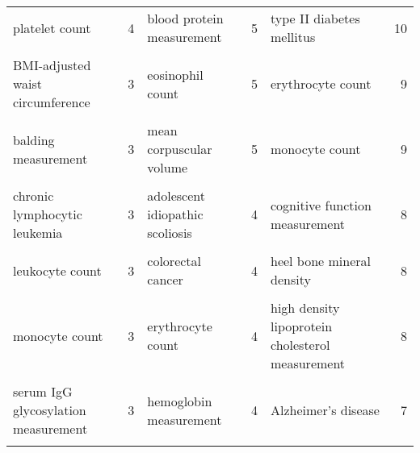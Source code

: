 \begin{landscape}
\begin{table}[hp]
{\begin{tabular}[t]{lrlrlr}
platelet count & 4 & blood protein measurement & 5 & type II diabetes mellitus & 10\\
\cellcolor{gray!6}{Abnormality of refraction} & \cellcolor{gray!6}{3} & \cellcolor{gray!6}{diastolic blood pressure} & \cellcolor{gray!6}{5} & \cellcolor{gray!6}{colorectal cancer} & \cellcolor{gray!6}{9}\\
BMI-adjusted waist circumference & 3 & eosinophil count & 5 & erythrocyte count & 9\\
\cellcolor{gray!6}{DNA methylation} & \cellcolor{gray!6}{3} & \cellcolor{gray!6}{lymphocyte percentage of leukocytes} & \cellcolor{gray!6}{5} & \cellcolor{gray!6}{intelligence} & \cellcolor{gray!6}{9}\\
balding measurement & 3 & mean corpuscular volume & 5 & monocyte count & 9\\
\cellcolor{gray!6}{bone density} & \cellcolor{gray!6}{3} & \cellcolor{gray!6}{schizophrenia} & \cellcolor{gray!6}{5} & \cellcolor{gray!6}{smoking status measurement} & \cellcolor{gray!6}{9}\\
chronic lymphocytic leukemia & 3 & adolescent idiopathic scoliosis & 4 & cognitive function measurement & 8\\
\cellcolor{gray!6}{hematocrit} & \cellcolor{gray!6}{3} & \cellcolor{gray!6}{breast carcinoma} & \cellcolor{gray!6}{4} & \cellcolor{gray!6}{forced expiratory volume} & \cellcolor{gray!6}{8}\\
leukocyte count & 3 & colorectal cancer & 4 & heel bone mineral density & 8\\
\cellcolor{gray!6}{mean corpuscular hemoglobin} & \cellcolor{gray!6}{3} & \cellcolor{gray!6}{eosinophil percentage of leukocytes} & \cellcolor{gray!6}{4} & \cellcolor{gray!6}{hemoglobin measurement} & \cellcolor{gray!6}{8}\\
monocyte count & 3 & erythrocyte count & 4 & high density lipoprotein cholesterol measurement & 8\\
\cellcolor{gray!6}{platelet crit} & \cellcolor{gray!6}{3} & \cellcolor{gray!6}{gut microbiome measurement} & \cellcolor{gray!6}{4} & \cellcolor{gray!6}{triglyceride measurement} & \cellcolor{gray!6}{8}\\
serum IgG glycosylation measurement & 3 & hemoglobin measurement & 4 & Alzheimer's disease & 7\\
\cellcolor{gray!6}{testosterone measurement} & \cellcolor{gray!6}{3} & \cellcolor{gray!6}{mathematical ability} & \cellcolor{gray!6}{4} & \cellcolor{gray!6}{BMI-adjusted waist circumference} & \cellcolor{gray!6}{7}\\

\end{tabular}}
\end{table}
\end{landscape}
